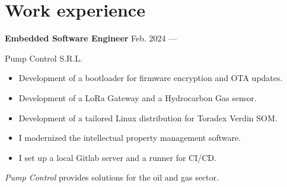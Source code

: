 \section{Work experience}


\parbox[t][][t]{\linewidth}{
	\parbox{\linewidth}{
		\textbf{Embedded Software Engineer}
			\hfill
			{Feb. 2024 --- \phantom{Dec. 2099}}
		}
	\smallbreak
	\parbox{\linewidth}{Pump Control S.R.L.}
	\smallbreak
		\begin{itemize}
			\item{Development of a bootloader for firmware encryption and OTA updates.}
			\item{Development of a LoRa Gateway and a Hydrocarbon Gas sensor.}
			\item{Development of a tailored Linux distribution for Toradex Verdin SOM.}
			\item{I modernized the intellectual property management software.}
			\item{I set up a local Gitlab server and a runner for CI/CD.}
		\end{itemize}
	\smallbreak
    \emph{Pump Control} provides solutions for the oil and gas sector.
}

